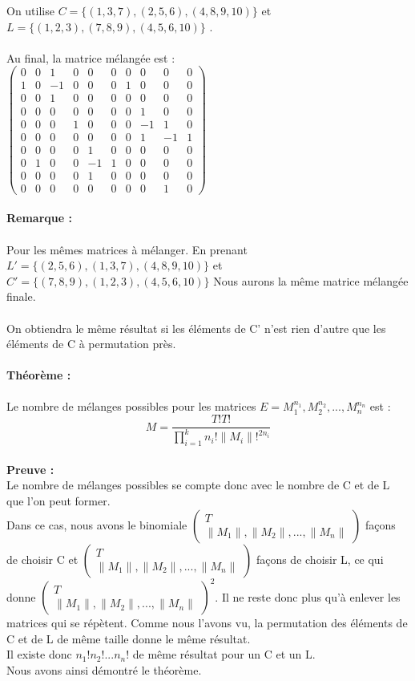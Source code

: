 \documentclass{book}
\begin{document}
 On utilise $C=\{ (1,3,7), (2,5,6), (4,8,9,10) \}$ et $L=\{ (1,2,3), (7,8,9), (4,5,6,10) \}$ . \\\\
 Au final, la matrice mélangée est : \\
 $\begin{pmatrix}
 0&0&1&0&0&0&0&0&0&0\\1&0&-1&0&0&0&1&0&0&0\\0&0&1&0&0&0&0&0&0&0\\0&0&0&0&0&0&0&1&0&0\\0&0&0&1&0&0&0&-1&1&0\\0&0&0&0&0&0&0&1&-1&1\\0&0&0&0&1&0&0&0&0&0\\0&1&0&0&-1&1&0&0&0&0\\0&0&0&0&1&0&0&0&0&0\\0&0&0&0&0&0&0&0&1&0
 \end{pmatrix}$\\\\
 \textbf{Remarque : } \\\\
 Pour les mêmes matrices à mélanger. En prenant $L'=\{ (2,5,6), (1,3,7), (4,8,9,10) \}$ et $C'=\{ (7,8,9), (1,2,3), (4,5,6,10) \}$ Nous aurons la même matrice mélangée finale. \\ \\
 On obtiendra le même résultat si les éléments de C' n'est rien d'autre que les éléments de C à permutation près.  \\ \\
 \textbf{Théorème : }  \\\\
 Le nombre de mélanges possibles pour les matrices $E={M_1^{n_1}, M_2^{n_2}, ... , M_n^{n_n}}$ est : \\
 \begin{equation}
 M=\frac{T!T!}{\prod_{i=1}^{k} n_i! \|M_i\|!^{2n_i}} 
 \end{equation} \\
 \textbf{Preuve : } \\
 Le nombre de mélanges possibles se compte donc avec le nombre de C et de L que l'on peut former. \\ Dans ce cas, nous avons le binomiale $\begin{pmatrix} T\\ \|M_1\|,\|M_2\|,...,\|M_n\|
 \end{pmatrix}$ façons de choisir C et $\begin{pmatrix} T\\ \|M_1\|,\|M_2\|,...,\|M_n\|
 \end{pmatrix}$ façons de choisir L, ce qui donne $\begin{pmatrix} T\\ \|M_1\|,\|M_2\|,...,\|M_n\|
 \end{pmatrix}^2$. Il ne reste donc plus qu'à enlever les matrices qui se répètent. Comme nous l'avons vu, la permutation des éléments de C et de L de même taille donne le même résultat. \\
 Il existe donc $n_1!n_2!...n_n!$ de même résultat pour un C et un L.  \\Nous avons ainsi démontré le théorème. \\
 
\end{document}
